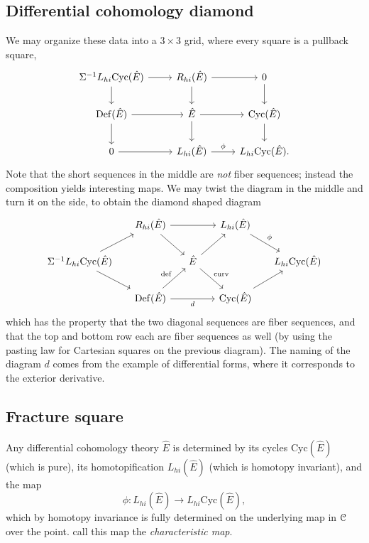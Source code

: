 \documentclass[10pt]{amsart}
\begin{document}
\subsection{Differential cohomology diamond}
We may organize these data into a $3 \times 3$ grid, where every square is a pullback square,
\begin{equation*}
\begin{tikzcd}
\Sigma^{-1} L_{hi}\mathrm{Cyc}(\hat{E}) 
\ar[r] \ar[d] 
& 
R_{hi}(\hat{E})
\ar[r] \ar[d] 
&
0
 \ar[d] 
\\
\mathrm{Def}(\hat{E})
\ar[r] \ar[d] 
&
\hat{E}
\ar[r] \ar[d] 
&
\mathrm{Cyc}(\hat{E})
\ar[d] 
\\
0 \ar[r]
&
L_{hi}(\hat{E}) \ar[r, "\phi"] &
L_{hi}\mathrm{Cyc}(\hat{E}).
\end{tikzcd}
\end{equation*}
Note that the short sequences in the middle are \emph{not} fiber sequences; instead the composition yields interesting maps. We may twist the diagram in the middle and turn it on the side, to obtain the diamond shaped diagram
\begin{equation*}
\begin{tikzcd}[column sep=0.5cm]
& 
R_{hi}(\hat{E}) 
\ar[dr]\ar[rr]
& & 
L_{hi}(\hat{E}) 
\ar[dr, "\phi"] 
&
\\ 	
\Sigma^{-1} L_{hi}\mathrm{Cyc}(\hat{E})
\ar[ur]
\ar[dr]
& & 
\hat{E} 
\ar[ur]
\ar[dr, "\mathrm{curv}"]
& & 
L_{hi}\mathrm{Cyc}(\hat{E})
\\
& 
\mathrm{Def}(\hat{E})
\ar[ur, "\mathrm{def}"]
\ar[rr, "d"']
& & 
\mathrm{Cyc}(\hat{E}) 
\ar[ur]
&
\end{tikzcd}
\end{equation*}
which has the property that the two diagonal sequences are fiber sequences, and that the top and bottom row each are fiber sequences as well (by using the pasting law for Cartesian squares on the previous diagram). The naming of the diagram $d$ comes from the example of differential forms, where it corresponds to the exterior derivative.

\subsection{Fracture square}
Any differential cohomology theory $\hat{E}$ is determined by its cycles $\mathrm{Cyc}(\hat{E})$ (which is pure), its homotopification $L_{hi}(\hat{E})$ (which is homotopy invariant), and the map
\[
\phi : L_{hi}(\hat{E}) \longrightarrow L_{hi}\mathrm{Cyc}(\hat{E}),
\]
which by homotopy invariance is fully determined on the underlying map in $\mathcal{C}$ over the point. \cite{bunkenikolausvoelkl2016diffcoh} call this map the \emph{characteristic map}.
\end{document}
